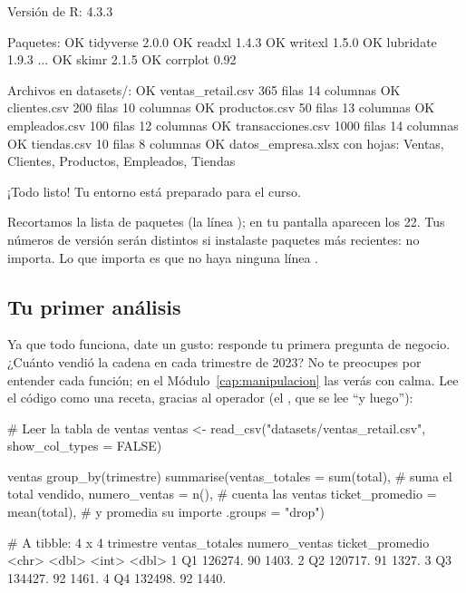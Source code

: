 \begin{rsalida}
Versión de R: 4.3.3

Paquetes:
  OK     tidyverse       2.0.0
  OK     readxl          1.4.3
  OK     writexl         1.5.0
  OK     lubridate       1.9.3
...
  OK     skimr           2.1.5
  OK     corrplot        0.92

Archivos en datasets/:
  OK     ventas_retail.csv    365 filas  14 columnas
  OK     clientes.csv         200 filas  10 columnas
  OK     productos.csv         50 filas  13 columnas
  OK     empleados.csv        100 filas  12 columnas
  OK     transacciones.csv   1000 filas  14 columnas
  OK     tiendas.csv           10 filas   8 columnas
  OK     datos_empresa.xlsx con hojas:
         Ventas, Clientes, Productos, Empleados, Tiendas

¡Todo listo! Tu entorno está preparado para el curso.
\end{rsalida}

Recortamos la lista de paquetes (la línea ); en tu pantalla
aparecen los 22. Tus números de versión serán
distintos si instalaste paquetes más recientes: no importa. Lo que importa
es que no haya ninguna línea .

\subsection{Tu primer análisis}

Ya que todo funciona, date un gusto: responde tu primera pregunta de
negocio. ¿Cuánto vendió la cadena en cada trimestre de 2023? No te
preocupes por entender cada función; en el Módulo~\ref{cap:manipulacion}
las verás con calma. Lee el código como una receta, gracias al operador
\codigo{\%>\%} (el , que se lee ``y luego''):

\begin{rcode}
# Leer la tabla de ventas
ventas <- read_csv("datasets/ventas_retail.csv", show_col_types = FALSE)

ventas %
  group_by(trimestre) %
  summarise(ventas_totales = sum(total),    # suma el total vendido,
            numero_ventas = n(),            # cuenta las ventas
            ticket_promedio = mean(total),  # y promedia su importe
            .groups = "drop")
\end{rcode}

\begin{rsalida}
# A tibble: 4 x 4
  trimestre ventas_totales numero_ventas ticket_promedio
  <chr>              <dbl>         <int>           <dbl>
1 Q1               126274.            90           1403.
2 Q2               120717.            91           1327.
3 Q3               134427.            92           1461.
4 Q4               132498.            92           1440.
\end{rsalida}

